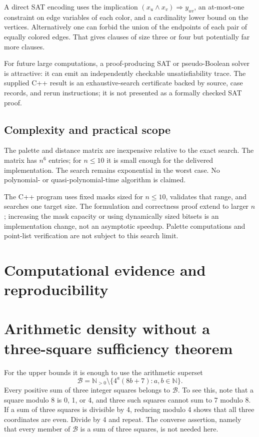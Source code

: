 \documentclass[11pt,letterpaper]{article}
\theoremstyle{definition}
\newcommand{\NN}{\mathbb N}
\newcommand{\calB}{\mathcal B}
\begin{document}
A direct SAT encoding uses the implication
\((x_u\land x_v)\Rightarrow y_{uv}\), an at-most-one constraint on
edge variables of each color, and a cardinality lower bound on the
vertices. Alternatively one can forbid the union of the endpoints of
each pair of equally colored edges. That gives clauses of size three or
four but potentially far more clauses.

For future large computations, a proof-producing SAT or pseudo-Boolean
solver is attractive: it can emit an independently checkable
unsatisfiability trace. The supplied C++ result is an exhaustive-search
certificate backed by source, case records, and rerun instructions;
it is not presented as a formally checked SAT proof.

\subsection{Complexity and practical scope}
The palette and distance matrix are inexpensive relative to the exact
search. The matrix has \(n^6\) entries; for \(n\le10\) it is small enough
for the delivered implementation. The search remains exponential in
the worst case. No polynomial- or quasi-polynomial-time algorithm is
claimed.

The C++ program uses fixed masks sized for \(n\le10\), validates that
range, and searches one target size. The formulation and correctness
proof extend to larger \(n\); increasing the mask capacity or using
dynamically sized bitsets is an implementation change, not an
asymptotic speedup. Palette computations and point-list verification
are not subject to this search limit.

\section{Computational evidence and reproducibility}
\label{sec:computations}


\section{Arithmetic density without a three-square sufficiency theorem}
\label{sec:arithmetic}
For the upper bounds it is enough to use the arithmetic superset
\[
 \calB=\NN_{>0}\setminus
 \{4^a(8b+7):a,b\in\NN\}.
\]
Every positive sum of three integer squares belongs to \(\calB\).
To see this, note that a square modulo 8 is 0, 1, or 4, and three such
squares cannot sum to 7 modulo 8. If a sum of three squares is divisible
by 4, reducing modulo 4 shows that all three coordinates are even.
Divide by 4 and repeat. The converse assertion, namely that every
member of \(\calB\) is a sum of three squares, is not needed here.
\end{document}
